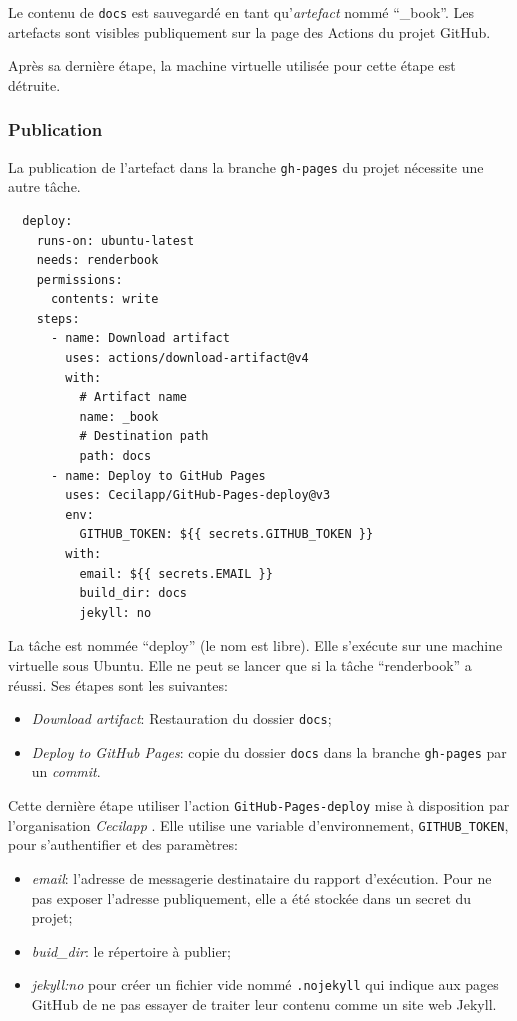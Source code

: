 \documentclass[
  12pt,
  french,
  a4paper,
  extrafontsizes,onecolumn,openright
  ]{memoir}
\providecommand{\tightlist}{%
  \setlength{\itemsep}{0pt}\setlength{\parskip}{0pt}}
\begin{document}
Le contenu de \texttt{docs} est sauvegardé en tant qu'\emph{artefact} nommé ``\_book''.
Les artefacts sont visibles publiquement sur la page des Actions du projet GitHub.

Après sa dernière étape, la machine virtuelle utilisée pour cette étape est détruite.

\subsubsection{Publication}\label{publication}

La publication de l'artefact dans la branche \texttt{gh-pages} du projet nécessite une autre tâche.

\begin{verbatim}
  deploy:
    runs-on: ubuntu-latest
    needs: renderbook
    permissions:
      contents: write
    steps:
      - name: Download artifact
        uses: actions/download-artifact@v4
        with:
          # Artifact name
          name: _book
          # Destination path
          path: docs
      - name: Deploy to GitHub Pages
        uses: Cecilapp/GitHub-Pages-deploy@v3
        env:
          GITHUB_TOKEN: ${{ secrets.GITHUB_TOKEN }}
        with:
          email: ${{ secrets.EMAIL }}
          build_dir: docs
          jekyll: no
\end{verbatim}

La tâche est nommée \enquote{deploy} (le nom est libre).
Elle s'exécute sur une machine virtuelle sous Ubuntu.
Elle ne peut se lancer que si la tâche \enquote{renderbook} a réussi.
Ses étapes sont les suivantes:

\begin{itemize}
\tightlist
\item
  \emph{Download artifact}: Restauration du dossier \texttt{docs};
\item
  \emph{Deploy to GitHub Pages}: copie du dossier \texttt{docs} dans la branche \texttt{gh-pages} par un \emph{commit}.
\end{itemize}

Cette dernière étape utiliser l'action \texttt{GitHub-Pages-deploy} mise à disposition par l'organisation \emph{Cecilapp} .
Elle utilise une variable d'environnement, \texttt{GITHUB\_TOKEN}, pour s'authentifier et des paramètres:

\begin{itemize}
\tightlist
\item
  \emph{email}: l'adresse de messagerie destinataire du rapport d'exécution.
  Pour ne pas exposer l'adresse publiquement, elle a été stockée dans un secret du projet;
\item
  \emph{buid\_dir}: le répertoire à publier;
\item
  \emph{jekyll:no} pour créer un fichier vide nommé \texttt{.nojekyll} qui indique aux pages GitHub de ne pas essayer de traiter leur contenu comme un site web Jekyll.
\end{itemize}
\end{document}
